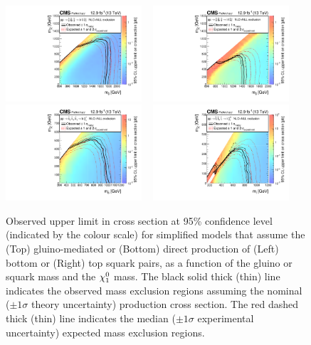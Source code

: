 \begin{figure}[thp!]
  \begin{center}
    \includegraphics[width=0.45\textwidth]{./Figures/statisticalResults/SUS16T1bbbbXSEC.pdf} ~
    \includegraphics[width=0.45\textwidth]{./Figures/statisticalResults/SUS16T1ttttXSEC.pdf} \\
    \includegraphics[width=0.45\textwidth]{./Figures/statisticalResults/SUS16T2bbXSEC.pdf} ~
    \includegraphics[width=0.45\textwidth]{./Figures/statisticalResults/SUS16T2ttXSEC.pdf} 
    \caption{Observed upper limit in cross section at 95\% confidence
      level (indicated by the colour scale) for simplified models that
      assume the (Top) gluino-mediated or (Bottom) direct production
      of (Left) bottom or (Right) top squark pairs, as a function of
      the gluino or squark mass and the $\chi^{0}_{1}$ 
      mass. The black solid thick (thin) line indicates the observed
      mass exclusion regions assuming the nominal (${\pm}1 \sigma$
      theory uncertainty) production cross section. The red dashed
      thick (thin) line indicates the median (${\pm}1 \sigma$
      experimental uncertainty) expected mass exclusion
      regions. 
      \label{fig:limits-sms} }
  \end{center}
\end{figure}

